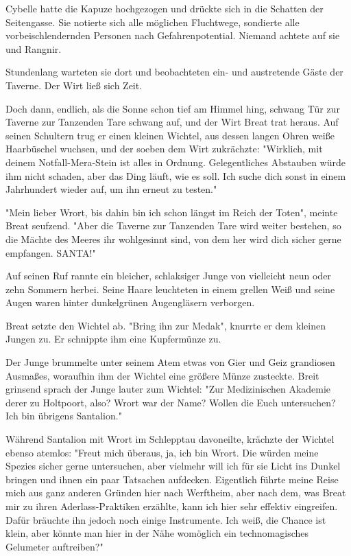 Cybelle hatte die Kapuze hochgezogen und drückte sich in die Schatten der Seitengasse. Sie notierte sich alle möglichen Fluchtwege, sondierte alle vorbeischlendernden Personen nach Gefahrenpotential. Niemand achtete auf sie und Rangnir.

Stundenlang warteten sie dort und beobachteten ein- und austretende Gäste der Taverne. Der Wirt ließ sich Zeit.

Doch dann, endlich, als die Sonne schon tief am Himmel hing, schwang Tür zur Taverne zur Tanzenden Tare schwang auf, und der Wirt Breat trat heraus. Auf seinen Schultern trug er einen kleinen Wichtel, aus dessen langen Ohren weiße Haarbüschel wuchsen, und der soeben dem Wirt zukrächzte: "Wirklich, mit deinem Notfall-Mera-Stein ist alles in Ordnung. Gelegentliches Abstauben würde ihm nicht schaden, aber das Ding läuft, wie es soll. Ich suche dich sonst in einem Jahrhundert wieder auf, um ihn erneut zu testen."

"Mein lieber Wrort, bis dahin bin ich schon längst im Reich der Toten", meinte Breat seufzend. "Aber die Taverne zur Tanzenden Tare wird weiter bestehen, so die Mächte des Meeres ihr wohlgesinnt sind, von dem her wird  dich sicher gerne empfangen. SANTA!"

Auf seinen Ruf rannte ein bleicher, schlaksiger Junge von vielleicht neun oder zehn Sommern herbei. Seine Haare leuchteten in einem grellen Weiß und seine Augen waren hinter dunkelgrünen Augengläsern verborgen.

Breat setzte den Wichtel ab. "Bring ihn zur Medak", knurrte er dem kleinen Jungen zu. Er schnippte ihm eine Kupfermünze zu.

Der Junge brummelte unter seinem Atem etwas von Gier und Geiz grandiosen Ausmaßes, woraufhin ihm der Wichtel eine größere Münze zusteckte. Breit grinsend sprach der Junge lauter zum Wichtel: "Zur Medizinischen Akademie derer zu Holtpoort, also? Wrort war der Name? Wollen die  Euch untersuchen? Ich bin übrigens Santalion."

Während Santalion mit Wrort im Schlepptau davoneilte, krächzte der Wichtel ebenso atemlos: "Freut mich überaus, ja, ich bin Wrort. Die  würden meine Spezies sicher gerne untersuchen, aber vielmehr will ich für sie Licht ins Dunkel bringen und ihnen ein paar Tatsachen aufdecken. Eigentlich führte meine Reise mich aus ganz anderen Gründen hier nach Werftheim, aber nach dem, was Breat mir zu ihren Aderlass-Praktiken erzählte, kann ich hier sehr effektiv eingreifen. Dafür bräuchte ihn jedoch noch einige Instrumente. Ich weiß, die Chance ist klein, aber könnte man hier in der Nähe womöglich ein technomagisches Gelumeter auftreiben?"

